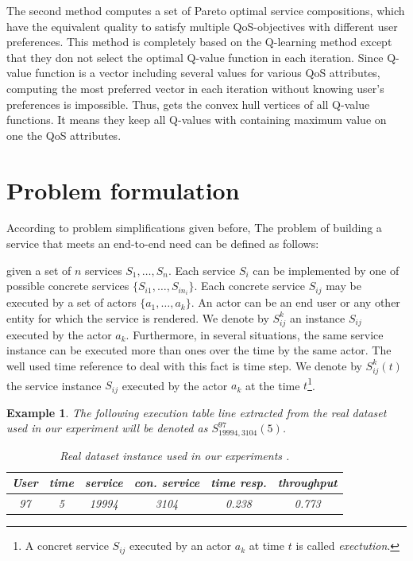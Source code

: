 \documentclass[10pt,journal,compsoc]{IEEEtran}
\newtheorem{example}{Example}
\begin{document}
 The second method computes a set of Pareto optimal service compositions, which have the equivalent quality to satisfy multiple QoS-objectives with different user preferences. This method is completely based on the Q-learning method except that they don not select the optimal Q-value function in each iteration. Since Q-value function is a vector including several values for various QoS attributes, computing the most preferred vector in each iteration without knowing user's preferences is impossible. Thus,  \cite{Mostafa2015} gets the convex hull vertices of all Q-value functions. It means they keep all Q-values with containing maximum value on one the QoS attributes. 

\section{Problem formulation}
According to problem simplifications given before, The problem of building a service that meets an end-to-end need can be defined as follows: 

given a set of $n$ services $S_1,\dots, S_n$. Each service $S_i$ can be implemented by one of possible concrete services $\{ S_{i1}, \dots, S_{in_i}\}$. Each concrete service $S_{ij}$ may be executed by a set of actors $\{a_1, \dots, a_k\}$. An actor can be an end user or any other entity for which the service is rendered. We denote by  $S_{ij}^k$ an instance $S_{ij}$ executed by the actor $a_k$. Furthermore, in several situations, the same service instance can be executed more than ones over the time by the same actor. The well used time reference to deal with this fact is time step.   We denote by $S_{ij}^k(t)$  the service instance $S_{ij}$ executed by the actor $a_k$ at the time $t$\footnote{A concret service $S_{ij}$ executed by an actor $a_k$ at time $t$ is called {\it exectution}.}. 
\begin{example} The following execution table line extracted from the real dataset used in our experiment will be denoted as $S_{19994,3104}^{97}(5)$.
\begin{table}[htp]
\caption{Real dataset instance used in our experiments \cite{sourceDesDonnees}.}
\begin{center}
\begin{tabular}{|c|c|c|c|c|c|}
\hline
User&time&service&con. service& time resp.& throughput  \\
\hline
97& 5& 19994& 3104&0.238&0.773\\
\hline
\end{tabular}
\end{center}
\label{default}
\end{table}%

\end{example}
\end{document}
